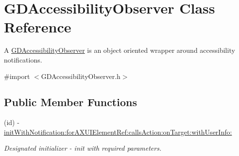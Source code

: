 \hypertarget{interface_g_d_accessibility_observer}{
\section{GDAccessibilityObserver Class Reference}
\label{interface_g_d_accessibility_observer}
}


A \hyperlink{interface_g_d_accessibility_observer}{GDAccessibilityObserver} is an object oriented wrapper around accessibility notifications.  


{\ttfamily \#import $<$GDAccessibilityObserver.h$>$}\subsection*{Public Member Functions}
\begin{DoxyCompactItemize}
\item 
(id) -\/ \hyperlink{interface_g_d_accessibility_observer_a38b7e5cbcdd5a9d4ff0e61fef5fede37}{initWithNotification:forAXUIElementRef:callsAction:onTarget:withUserInfo:}
\begin{DoxyCompactList}\small\item\em Designated initializer -\/ init with required parameters. \item\end{DoxyCompactList}\end{DoxyCompactItemize}
